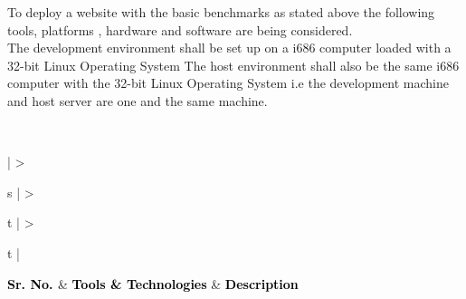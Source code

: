 \documentclass[hidelinks,a4paper,12pt]{article}
\begin{document}
\bigskip
\noindent

To deploy a website with the basic benchmarks as stated above the following tools, platforms , hardware and software are being considered.
\\

The development environment shall be set up on a i686 computer loaded with a 32-bit Linux Operating System 
The host environment shall also be the same i686 computer with the 32-bit Linux Operating System i.e the development machine and host server are one and the same machine.

\newpage

\\
\noindent
	\begin{center}
				
							
		{
		\setlength{\extrarowheight}{2pt}
						
							
		\newcolumntype{b}{X}
		
		\renewcommand\thetable{1} 					
		 \label{table:1}
		\vspace{0.25cm}
									
		\begin{tabularx}{\textwidth}{ | >{\ttfamily\raggedright\arraybackslash} s 
		  | >{\ttfamily\raggedright\arraybackslash} t 
		  | >{\ttfamily\raggedright\arraybackslash} t | }
								
		\hline
								
		{\textbf{\textcolor{black}{\large {Sr. No.} \newline}}} & {\textbf{\textcolor{black}{\large {Tools \& Technologies}}}} & \textbf{\textcolor{black}{\large {Description}}} \\
								

\end{tabularx}}
\end{center}
\end{document}
